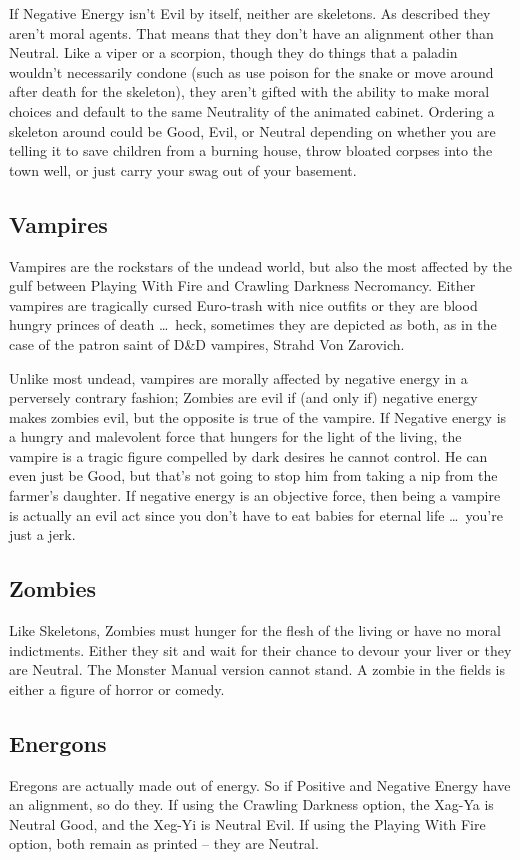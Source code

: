 If Negative Energy isn't Evil by itself, neither are skeletons. As described they aren't moral agents. That means that they don't have an alignment other than Neutral. Like a viper or a scorpion, though they do things that a paladin wouldn't necessarily condone (such as use poison for the snake or move around after death for the skeleton), they aren't gifted with the ability to make moral choices and default to the same Neutrality of the animated cabinet. Ordering a skeleton around could be Good, Evil, or Neutral depending on whether you are telling it to save children from a burning house, throw bloated corpses into the town well, or just carry your swag out of your basement.

\subsection{Vampires} Vampires are the rockstars of the undead world, but also the most affected by the gulf between Playing With Fire and Crawling Darkness Necromancy. Either vampires are tragically cursed Euro-trash with nice outfits or they are blood hungry princes of death \ldots\ heck, sometimes they are depicted as both, as in the case of the patron saint of D\&D vampires, Strahd Von Zarovich.

Unlike most undead, vampires are morally affected by negative energy in a perversely contrary fashion; Zombies are evil if (and only if) negative energy makes zombies evil, but the opposite is true of the vampire. If Negative energy is a hungry and malevolent force that hungers for the light of the living, the vampire is a tragic figure compelled by dark desires he cannot control. He can even just be Good, but that's not going to stop him from taking a nip from the farmer's daughter. If negative energy is an objective force, then being a vampire is actually an evil act since you don't have to eat babies for eternal life \ldots\  you're just a jerk.

\subsection{Zombies} Like Skeletons, Zombies must hunger for the flesh of the living or have no moral indictments. Either they sit and wait for their chance to devour your liver or they are Neutral. The Monster Manual version cannot stand. A zombie in the fields is either a figure of horror or comedy.

\subsection{Energons} Eregons are actually made out of energy. So if Positive and Negative Energy have an alignment, so do they. If using the Crawling Darkness option, the Xag-Ya is Neutral Good, and the Xeg-Yi is Neutral Evil. If using the Playing With Fire option, both remain as printed -- they are Neutral.

